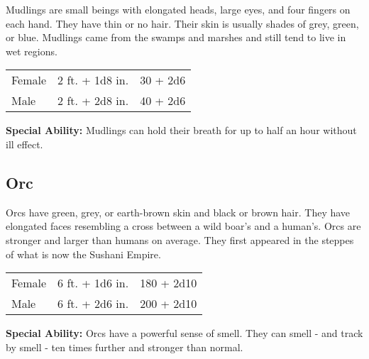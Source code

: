 \begin{multicols}{2}
Mudlings are small beings with elongated heads, large eyes, and four fingers on each hand. They
have thin or no hair. Their skin is usually shades of grey, green, or blue.
Mudlings came from the swamps and marshes and still tend to live in wet regions.

\begin{center}
{
\begin{xtabular}{|l|l|l|}
Female & 2 ft. + 1d8 in. & 30 + 2d6 \\
Male & 2 ft. + 2d8 in. & 40 + 2d6 \\
\hline
\end{xtabular}
}
\end{center}

\textbf{Special Ability:} Mudlings can hold their breath for up to half an hour without ill effect.

\subsection{Orc} 

Orcs have green, grey, or earth-brown skin and black or brown hair. They have
elongated faces resembling a cross between a wild boar's and a human's. Orcs
are stronger and larger than humans on average. They first appeared in the steppes
of what is now the Sushani Empire.

\begin{center}
{
\begin{xtabular}{|l|l|l|}
Female & 6 ft. + 1d6 in. & 180 + 2d10 \\
Male & 6 ft. + 2d6 in. & 200 + 2d10 \\
\hline
\end{xtabular}
}
\end{center}

\textbf{Special Ability:} Orcs have a powerful sense of smell. They can smell - and track by smell - ten times further and stronger than normal.


\end{multicols}
